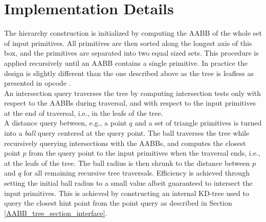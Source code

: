\section{Implementation Details}
\label{AABB_tree_section_details}

The hierarchy construction is initialized by computing the AABB of the whole set of input primitives. All primitives are then sorted along the longest axis of this box, and the primitives are separated into two equal sized sets. This procedure is applied recursively until an AABB contains a single primitive. In practice the design is slightly different than the one described above as the tree is leafless as presented in {\sc opcode} \cite{cgal:t-ocdl-05}.\\

An intersection query traverses the tree by computing intersection tests only with respect to the AABBs during traversal, and with respect to the input primitives at the end of traversal, i.e., in the leafs of the tree.\\

A distance query between, e.g., a point $q$ and a set of triangle primitives is turned into a \emph{ball} query centered at the query point. The ball traverses the tree while recursively querying intersections with the AABBs, and computes the closest point $p$ from the query point to the input primitives when the traversal ends, i.e., at the leafs of the tree. The ball radius is then shrunk to the distance between $p$ and $q$ for all remaining recursive tree traversals. Efficiency is achieved through setting the initial ball radius to a small value albeit guaranteed to intersect the input primitives. This is achieved by constructing an internal KD-tree used to query the closest hint point from the point query as described in Section \ref{AABB_tree_section_interface}.
